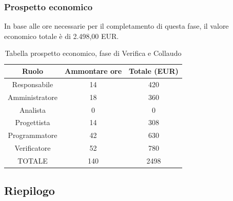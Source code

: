\subsubsection{Prospetto economico}
In base alle ore necessarie per il completamento di questa fase, il valore economico totale è di 2.498,00 EUR.
\begin{table}[h]
\caption{Tabella prospetto economico, fase di Verifica e Collaudo}  
\begin{center}
\begin{tabular}{ |c|c|c|  }
 \hline
 Ruolo 		& Ammontare ore 	& Totale (EUR)\\
 \hline
 \hline
 	Responsabile	& 14 	& 420\\
	Amministratore	& 18		& 360\\
	Analista		& 0 		& 0\\
	Progettista		& 14		& 308\\
	Programmatore	& 42		& 630\\
	Verificatore	& 52 	& 780\\
 \hline\hline
 TOTALE		& 140		& 2498\\
  \hline
\end{tabular}
\end{center}
\end{table}
\newpage
\subsection{Riepilogo}
